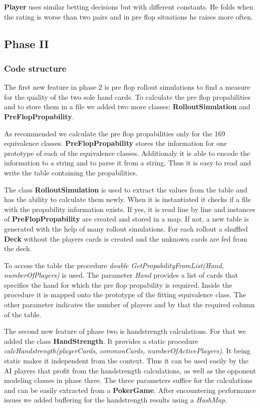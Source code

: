 \textbf{Player} uses similar betting decisions but with different constants. He folds when the rating is worse than two
pairs and in pre flop situations he raises more often.


\subsection{Phase II}

\subsubsection{Code structure}
The first new feature in phase 2 is pre flop rollout simulations to find a measure for the quality of the two sole hand
cards.
To calculate the pre flop propabilities and to store them in a file we added two more classes: \textbf{RolloutSimulation}
and \textbf{PreFlopPropability}.

As recommended we calculate the pre flop propabilities only for the 169 equivalence
classes. \textbf{PreFlopPropability} stores the information for one prototype of each of the equivalence classes.
Additionaly it is able to encode the information to a string and to parse it from a string. Thus it is easy to read and
write the table containing the propabilities.

The class \textbf{RolloutSimulation} is used to extract the values from the table and has the ability to calculate them
newly. When it is instantiated it checks if a file with the propability information exists. If yes, it is read line by
line and instances of \textbf{PreFlopPropability} are created and stored in a map. If not, a new table is generated 
with the help of many rollout simulations. For each rollout a shuffled \textbf{Deck} without the players cards is
created and the unknown cards are fed from the deck. 

To access the table the procedure \textit{double GetPropabilityFromList(Hand, numberOfPlayers)} is used. The parameter \textit{Hand} provides a list of cards that
specifies the hand for which the pre flop propability is required. Inside the procedure it is mapped onto the prototype
of the fitting equivalence class. The other parameter indicates the number of players and by that the required column of
the table.

The second new feature of phase two is handstrength calculations. For that we added the class \textbf{HandStrength}.
It provides a static procedure \textit{calcHandstrength(playerCards, commonCards, numberOfActivePlayers)}. It being
static makes it independent from the context. Thus it can be used easily by the AI players that profit from the
handstrength calculations, as well as the opponent modeling classes in phase three. The three parameters suffice for the
calculations and can be easily extracted from a \textbf{PokerGame}. After encountering performance issues we added
buffering for the handstrength results using a \textit{HashMap}.

